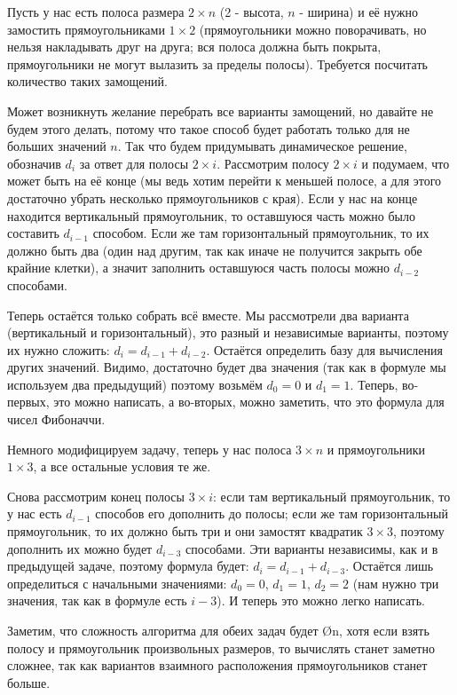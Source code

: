 Пусть у нас есть полоса размера $2 \times n$ (2 - высота, $n$ - ширина) и её нужно замостить прямоугольниками $1 \times 2$ (прямоугольники можно поворачивать, но нельзя накладывать друг на друга; вся полоса должна быть покрыта, прямоугольники не могут вылазить за пределы полосы). Требуется посчитать количество таких замощений.

Может возникнуть желание перебрать все варианты замощений, но давайте не будем этого делать, потому что такое способ будет работать только для не больших значений $n$. Так что будем придумывать динамическое решение, обозначив $d_i$ за ответ для полосы $2 \times i$. Рассмотрим полосу $2 \times i$ и подумаем, что может быть на её конце (мы ведь хотим перейти к меньшей полосе, а для этого достаточно убрать несколько прямоугольников с края). Если у нас на конце находится вертикальный прямоугольник, то оставшуюся часть можно было составить $d_{i - 1}$ способом. Если же там горизонтальный прямоугольник, то их должно быть два (один над другим, так как иначе не получится закрыть обе крайние клетки), а значит заполнить оставшуюся часть полосы можно $d_{i - 2}$ способами.

Теперь остаётся только собрать всё вместе. Мы рассмотрели два варианта (вертикальный и горизонтальный), это разный и независимые варианты, поэтому их нужно сложить: $d_i = d_{i - 1} + d_{i - 2}$. Остаётся определить базу для вычисления других значений. Видимо, достаточно будет два значения (так как в формуле мы используем два предыдущий) поэтому возьмём $d_0 = 0$ и $d_1 = 1$. Теперь, во-первых, это можно написать, а во-вторых, можно заметить, что это формула для чисел Фибоначчи.

Немного модифицируем задачу, теперь у нас полоса $3 \times n$ и прямоугольники $1 \times 3$, а все остальные условия те же.

Снова рассмотрим конец полосы $3 \times i$: если там вертикальный прямоугольник, то у нас есть $d_{i - 1}$ способов его дополнить до полосы; если же там горизонтальный прямоугольник, то их должно быть три и они замостят квадратик $3 \times 3$, поэтому дополнить их можно будет $d_{i - 3}$ способами. Эти варианты независимы, как и в предыдущей задаче, поэтому формула будет: $d_i = d_{i - 1} + d_{i - 3}$. Остаётся лишь определиться с начальными значениями: $d_0 = 0$, $d_1 = 1$, $d_2 = 2$ (нам нужно три значения, так как в формуле есть $i - 3$). И теперь это можно легко написать.

Заметим, что сложность алгоритма для обеих задач будет \O{n}, хотя если взять полосу и прямоугольник произвольных размеров, то вычислять станет заметно сложнее, так как вариантов взаимного расположения прямоугольников станет больше.

